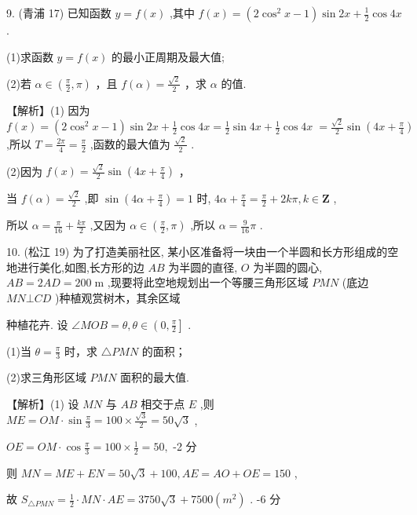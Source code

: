 \documentclass[10pt]{article}
\begin{document}
9. (青浦 17) 已知函数 \(y = f\left( x\right)\) ,其中 \(f\left( x\right)  = \left( {2{\cos }^{2}x - 1}\right) \sin {2x} + \frac{1}{2}\cos {4x}\) .

(1)求函数 \(y = f\left( x\right)\) 的最小正周期及最大值;

(2)若 \(\alpha  \in  \left( {\frac{\pi }{2},\pi }\right)\) ，且 \(f\left( \alpha \right)  = \frac{\sqrt{2}}{2}\) ，求 \(\alpha\) 的值.

【解析】(1) 因为 \(f\left( x\right)  = \left( {2{\cos }^{2}x - 1}\right) \sin {2x} + \frac{1}{2}\cos {4x} = \frac{1}{2}\sin {4x} + \frac{1}{2}\cos {4x} \; = \frac{\sqrt{2}}{2}\sin \left( {{4x} + \frac{\pi }{4}}\right)\) ,所以 \(T = \frac{2\pi }{4} = \frac{\pi }{2}\) ,函数的最大值为 \(\frac{\sqrt{2}}{2}\) .

(2)因为 \(f\left( x\right)  = \frac{\sqrt{2}}{2}\sin \left( {{4x} + \frac{\pi }{4}}\right)\) ，

当 \(f\left( \alpha \right)  = \frac{\sqrt{2}}{2}\) ,即 \(\sin \left( {{4\alpha } + \frac{\pi }{4}}\right)  = 1\) 时, \({4\alpha } + \frac{\pi }{4} = \frac{\pi }{2} + {2k\pi },k \in  \mathbf{Z}\) ,

所以 \(\alpha  = \frac{\pi }{16} + \frac{k\pi }{2}\) ,又因为 \(\alpha  \in  \left( {\frac{\pi }{2},\pi }\right)\) ,所以 \(\alpha  = \frac{9}{16}\pi\) .

10. (松江 19) 为了打造美丽社区, 某小区准备将一块由一个半圆和长方形组成的空地进行美化,如图,长方形的边 \({AB}\) 为半圆的直径, \(O\) 为半圆的圆心, \({AB} = {2AD} = {200}\mathrm{\;m}\) ,现要将此空地规划出一个等腰三角形区域 \({PMN}\) (底边 \({MN} \bot  {CD}\) )种植观赏树木，其余区域

种植花卉. 设 \(\angle {MOB} = \theta ,\theta  \in  \left( {0,\frac{\pi }{2}}\right\rbrack\) .

(1)当 \(\theta  = \frac{\pi }{3}\) 时，求 \(\bigtriangleup  {PMN}\) 的面积；

(2)求三角形区域 \({PMN}\) 面积的最大值.

【解析】(1) 设 \({MN}\) 与 \({AB}\) 相交于点 \(E\) ,则 \({ME} = {OM} \cdot  \sin \frac{\pi }{3} = {100} \times  \frac{\sqrt{3}}{2} = {50}\sqrt{3}\) ,

\({OE} = {OM} \cdot  \cos \frac{\pi }{3} = {100} \times  \frac{1}{2} = {50},\) -2 分

则 \({MN} = {ME} + {EN} = {50}\sqrt{3} + {100},{AE} = {AO} + {OE} = {150}\) ,

故 \({S}_{\bigtriangleup {PMN}} = \frac{1}{2} \cdot  {MN} \cdot  {AE} = {3750}\sqrt{3} + {7500}\left( {m}^{2}\right)\) . -6 分
\end{document}
